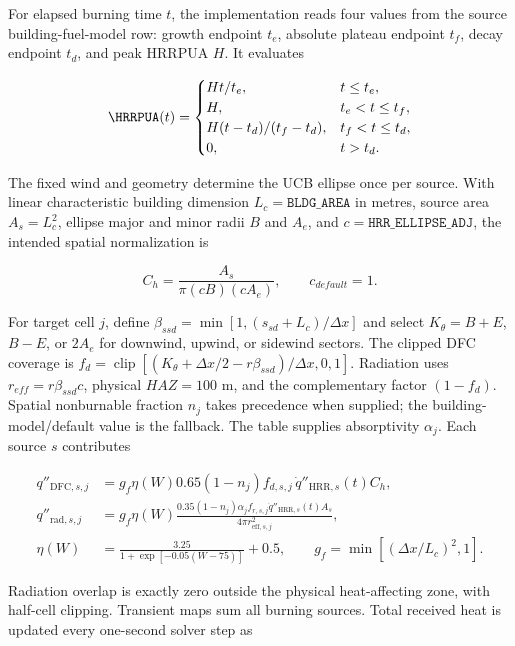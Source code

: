 For elapsed burning time $t$, the implementation reads four values from the
source building-fuel-model row: growth endpoint $t_e$, absolute plateau
endpoint $t_f$, decay endpoint $t_d$, and peak HRRPUA $H$.  It evaluates

\begin{equation}
 \HRRPUA(t)=
 \begin{cases}
   Ht/t_e, & t\le t_e,\\
   H, & t_e<t\le t_f,\\
   H(t-t_d)/(t_f-t_d), & t_f<t\le t_d,\\
   0, & t>t_d.
 \end{cases}
\end{equation}

The fixed wind and geometry determine the UCB ellipse once per source. With
linear characteristic building dimension $L_c=\texttt{BLDG\_AREA}$ in metres,
source area $A_s=L_c^2$, ellipse major and minor radii $B$ and $A_e$, and
$c=\texttt{HRR\_ELLIPSE\_ADJ}$, the intended spatial normalization is

\begin{equation}
 C_h=\frac{A_s}{\pi(cB)(cA_e)},\qquad c_{default}=1.
\end{equation}

For target cell $j$, define
$\beta_{ssd}=\min[1,(s_{sd}+L_c)/\Delta x]$ and select
$K_\theta=B+E$, $B-E$, or $2A_e$ for downwind, upwind, or sidewind sectors.
The clipped DFC coverage is
$f_d=\operatorname{clip}[(K_\theta+\Delta x/2-r\beta_{ssd})/\Delta x,0,1]$.
Radiation uses $r_{eff}=r\beta_{ssd}c$, physical $HAZ=100$ m, and the
complementary factor $(1-f_d)$. Spatial nonburnable fraction $n_j$ takes
precedence when supplied; the building-model/default value is the fallback.
The table supplies absorptivity $\alpha_j$. Each source $s$ contributes

\begin{align}
 q''_{\mathrm{DFC},s,j} &= g_f\eta(W)0.65(1-n_j)f_{d,s,j}\,\dot q''_{\mathrm{HRR},s}(t)C_h,\\
 q''_{\mathrm{rad},s,j} &= g_f\eta(W)\frac{0.35(1-n_j)\alpha_j f_{r,s,j}
                 \dot q''_{\mathrm{HRR},s}(t)A_s}{4\pi r_{\mathrm{eff},s,j}^2},\\
 \eta(W)&=\frac{3.25}{1+\exp[-0.05(W-75)]}+0.5,\qquad
 g_f=\min[(\Delta x/L_c)^2,1].
\end{align}

Radiation overlap is exactly zero outside the physical heat-affecting zone,
with half-cell clipping. Transient maps sum all burning
sources.  Total received heat is updated every one-second solver step as

